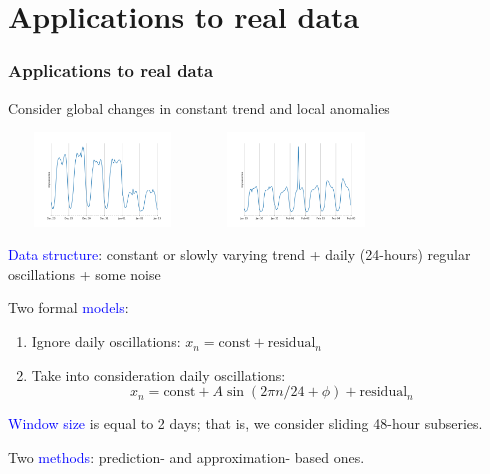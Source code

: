 \documentclass[intlimits, 9pt, unicode]{beamer}
\newcommand{\textblue}[1]{\textcolor{blue}{#1}}
\begin{document}
\section{Applications to real data}



\begin{frame}
    \frametitle{Applications to real data}

    Consider global changes in constant trend and local anomalies

\medskip
    \includegraphics[height = 2.5cm, width = 5.0cm]{images/cp_mean_2}\qquad
    \includegraphics[height = 2.5cm, width = 5.0cm]{images/005_point}

\medskip
\textblue{Data structure}: constant or slowly varying trend + daily (24-hours) regular oscillations + some noise

\medskip
Two formal \textblue{models}:

\medskip
\begin{enumerate}
\item
Ignore daily oscillations:
$ x_n = \mathrm{const} + \mathrm{residual}_n $
\item
Take into consideration daily oscillations:
$$ x_n = \mathrm{const} + A\sin(2\pi n/24+\phi) + \mathrm{residual}_n $$
\end{enumerate}

\medskip
\textblue{Window size} is equal to 2 days; that is, we consider sliding 48-hour subseries.

\medskip
Two \textblue{methods}: prediction- and approximation- based ones.

 \end{frame}
\end{document}
